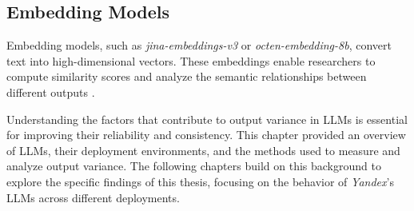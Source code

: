 \subsection{Embedding Models}

Embedding models, such as \textit{jina-embeddings-v3} \cite{sturuaJinaembeddingsv3MultilingualEmbeddings2024} or \textit{octen-embedding-8b}, convert text into high-dimensional vectors. These embeddings enable researchers to compute similarity scores and analyze the semantic relationships between different outputs \cite{keraghelWordsComparativeAnalysis2024}.

Understanding the factors that contribute to output variance in LLMs is essential for improving their reliability and consistency. This chapter provided an overview of LLMs, their deployment environments, and the methods used to measure and analyze output variance. The following chapters build on this background to explore the specific findings of this thesis, focusing on the behavior of \textit{Yandex}'s LLMs across different deployments.